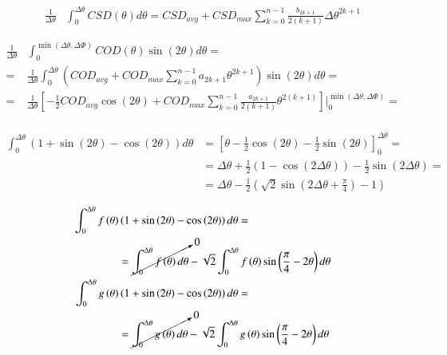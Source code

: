 \documentclass[review]{elsarticle}
\begin{document}
\begin{equation}
\begin{aligned}
\frac{1}{\Delta\theta}&\int_{0}^{\Delta\theta}CSD\left(\theta\right)d\theta=CSD_{avg}+CSD_{max}\sum_{k=0}^{n-1}\frac{b_{2k+1}}{2\left(k+1\right)}\Delta\theta^{2k+1}
\end{aligned}
\end{equation}

\begin{equation}
\begin{aligned}
\frac{1}{\Delta\theta}&\int_{0}^{\min\left(\Delta\theta,\Delta\Phi\right)}COD\left(\theta\right)\sin\left(2\theta\right)d\theta=\\
=&\frac{1}{\Delta\theta}\int_{0}^{\Delta\theta}\left(COD_{avg}+COD_{max}\sum_{k=0}^{n-1}a_{2k+1}\theta^{2k+1}\right)\sin\left(2\theta\right)d\theta=\\
=&\frac{1}{\Delta\theta}\left[-\frac{1}{2}COD_{avg}\cos\left(2\theta\right)+COD_{max}\sum_{k=0}^{n-1}\frac{a_{2k+1}}{2\left(k+1\right)}\theta^{2\left(k+1\right)}\right]\Bigg\rvert_{0}^{\min\left(\Delta\theta,\Delta\Phi\right)}=\\
\end{aligned}
\end{equation}

\begin{equation}
\begin{aligned}
\int_{0}^{\Delta\theta}\left(1+\sin\left(2\theta\right)-\cos\left(2\theta\right)\right)d\theta&=\left[\theta-\frac{1}{2}\cos\left(2\theta\right)-\frac{1}{2}\sin\left(2\theta\right)\right]_{0}^{\Delta\theta}=\\
&=\Delta\theta+\frac{1}{2}\left(1-\cos\left(2\Delta\theta\right)\right)-\frac{1}{2}\sin\left(2\Delta\theta\right)=\\
&=\Delta\theta-\frac{1}{2}\left(\sqrt{2}\sin\left(2\Delta\theta+\frac{\pi}{4}\right)-1\right)
\end{aligned}
\end{equation}

\begin{equation}
\begin{aligned}
\int_{0}^{\Delta\theta}f\left(\theta\right)&\left(1+\sin\left(2\theta\right)-\cos\left(2\theta\right)\right)d\theta=\\&=\cancelto{0}{\int_{0}^{\Delta\theta}f\left(\theta\right)d\theta}-\sqrt{2}\int_{0}^{\Delta\theta}f\left(\theta\right)\sin\left(\frac{\pi}{4}-2\theta\right)d\theta\\
\int_{0}^{\Delta\theta}g\left(\theta\right)&\left(1+\sin\left(2\theta\right)-\cos\left(2\theta\right)\right)d\theta=\\&=\cancelto{0}{\int_{0}^{\Delta\theta}g\left(\theta\right)d\theta}-\sqrt{2}\int_{0}^{\Delta\theta}g\left(\theta\right)\sin\left(\frac{\pi}{4}-2\theta\right)d\theta\\
\end{aligned}
\end{equation}
\end{document}
